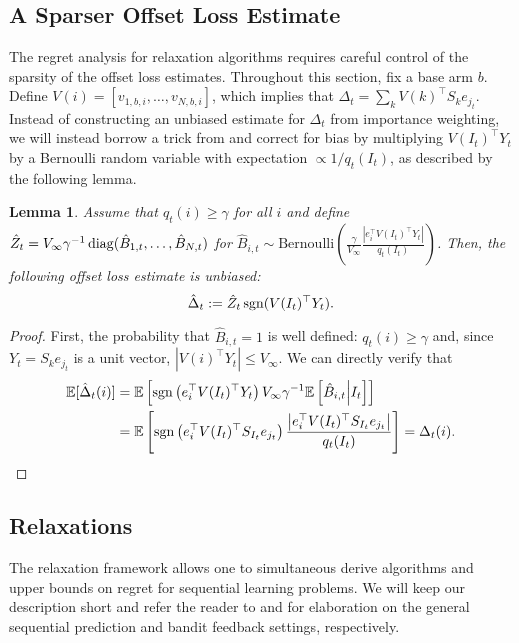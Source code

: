 \documentclass{article}
\newtheorem{lemma}{Lemma}
\begin{document}
\subsection{A Sparser Offset Loss Estimate}
The regret analysis for relaxation algorithms requires careful control of the sparsity of the offset loss estimates. Throughout this section, fix a base arm $b$. Define $V(i) = [v_{1,b,i},\ldots,v_{N,b,i}]$, which implies that $\Delta_t = \sum_k V(k)^\top S_k e_{j_t}$. Instead of constructing an unbiased estimate for $\Delta_t$ from importance weighting, we will instead borrow a trick from \cite{syrgkanis2016improved} and correct for bias by multiplying $V(I_t)^\top Y_t$ by a Bernoulli random variable with expectation $\propto 1/q_t(I_t)$, as described by the following lemma. 
\begin{lemma}
  Assume that $q_t(i)\geq \gamma$ for all $i$ and define $\hat Z_t = V_\infty \gamma^{-1} \operatorname*{diag}(\hat B_{1,t},\ldots,\hat B_{N,t})$ for
  $\hat B_{i,t} \sim \mathrm{Bernoulli}\left(\frac{\gamma}{V_\infty} \frac{|e_i^\top V(I_t)^\top Y_t|}{q_t(I_t)}\right)$.
Then, the following offset loss estimate is unbiased:
  \begin{equation}
    \hat\Delta_t := \hat Z_t \operatorname*{sgn}( V(I_t)^\top Y_t).
  \end{equation}
\end{lemma}
\begin{proof}
  First, the probability that $\hat B_{i,t} = 1$ is well defined: $q_t(i)\geq \gamma$ and, since $Y_t = S_k e_{j_t}$ is a unit vector, $|V(i)^\top Y_t|\leq V_\infty$.
  We can directly verify that
  \begin{align*}
    \mathbb E[\hat\Delta_t(i)]
    &=
      \mathbb E\left[    
      \operatorname*{sgn}\left(e_i^\top V(I_t)^\top Y_t\right) V_\infty \gamma^{-1} \mathbb E\left[\hat B_{i,t}\middle|I_t\right]\right]\\
    &=
      \mathbb E\left[
      \operatorname*{sgn}\left(e_i^\top V(I_t)^\top S_{I_t} e_{j_t}\right)
      \frac{\left|e_i^\top V(I_t)^\top S_{I_t} e_{j_t}\right|}{q_t(I_t)}\right]
      = \Delta_t(i).
  \end{align*}
\end{proof}

\subsection{Relaxations}
The relaxation framework allows one to simultaneous derive algorithms and upper bounds on regret for sequential learning problems. We will keep our description short and refer the reader to \cite{rakhlinrelax} and \cite{rakhlin2016bistro} for elaboration on the general sequential prediction and bandit feedback settings, respectively.
\end{document}
